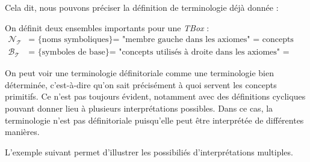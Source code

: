\par Cela dit, nous pouvons préciser la définition de terminologie déjà donnée :


\par On définit deux ensembles importants pour une \emph{TBox} :
\begin{align}
  \mathcal{N}_{\mathcal{T}} & =\mbox{ \{ noms symboliques\} = "membre gauche dans les axiomes" = concepts définis} \\
  \mathcal{B}_{\mathcal{T}} & =\mbox{ \{ symboles de base\} = "concepts utilisés à droite dans les  axiomes" = concepts primitifs}
\end{align}





\par On peut voir une terminologie définitoriale comme une terminologie  bien déterminée, c'est-à-dire qu'on sait précisément à quoi servent les concepts primitifs. Ce n'est pas toujours évident, notamment avec des définitions cycliques pouvant donner lieu à plusieurs interprétations possibles. Dans ce cas, la terminologie n'est pas définitoriale puisqu'elle peut être interprétée de différentes manières.

\par L'exemple suivant permet d'illustrer les possibiliés d'interprétations multiples.

